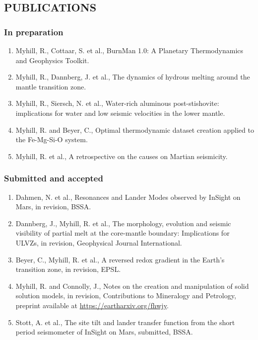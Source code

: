 \documentclass[11pt,twoside,a4paper]{article}
\begin{document}
\clearpage
\subsection*{PUBLICATIONS}
\subsubsection*{In preparation}
\small \sloppy
\begin{enumerate}
\item Myhill, R., Cottaar, S. et al., BurnMan 1.0: A Planetary Thermodynamics and Geophysics Toolkit.
\item Myhill, R., Dannberg, J. et al., The dynamics of hydrous melting around the mantle transition zone.
\item Myhill, R., Siersch, N. et al., Water-rich aluminous post-stishovite: implications for water and low seismic velocities in the lower mantle.
\item Myhill, R. and Beyer, C., Optimal thermodynamic dataset creation applied to the Fe-Mg-Si-O system.
\item Myhill, R. et al., A retrospective on the causes on Martian seismicity.
\end{enumerate}

\subsubsection*{Submitted and accepted}
\begin{enumerate}
  \item Dahmen, N. et al., Resonances and Lander Modes observed by InSight on Mars, in revision, BSSA.
  \item Dannberg, J., Myhill, R. et al., The morphology, evolution and seismic visibility of partial melt at the core-mantle boundary: Implications for ULVZs, in revision, Geophysical Journal International.
  \item Beyer, C., Myhill, R. et al., A reversed redox gradient in the Earth's transition zone, in revision, EPSL.
  \item Myhill, R. and Connolly, J., Notes on the creation and manipulation of solid solution models, in revision, Contributions to Mineralogy and Petrology, preprint available at \href{https://eartharxiv.org/fhwjy}{https://eartharxiv.org/fhwjy}.
  \item Stott, A. et al., The site tilt and lander transfer function from the short period seismometer of InSight on Mars, submitted, BSSA.
\end{enumerate}
\end{document}
